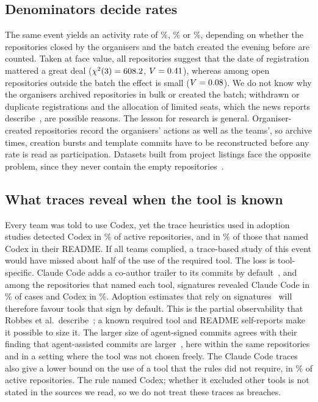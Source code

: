 \documentclass{article}
\begin{document}
\subsection{Denominators decide rates}
The same event yields an activity rate of \NRqOneActivePct\%, \NRqOneActiveOfOpenPct\% or \NRqOneActiveOfOpenNonbatchPct\%, depending on whether the repositories closed by the organisers and the batch created the evening before are counted. Taken at face value, all repositories suggest that the date of registration mattered a great deal ($\chi^2(\num{3}) = \num{608.2}$, $V = \num{0.41}$), whereas among open repositories outside the batch the effect is small ($V = \num{0.08}$). We do not know why the organisers archived repositories in bulk or created the batch; withdrawn or duplicate registrations and the allocation of limited seats, which the news reports describe~\cite{qumash2026queue,ulys2026survival}, are possible reasons. The lesson for research is general. Organiser-created repositories record the organisers' actions as well as the teams', so archive times, creation bursts and template commits have to be reconstructed before any rate is read as participation. Datasets built from project listings face the opposite problem, since they never contain the empty repositories~\cite{imam2021secretlife,mahmoud2022oneoff}.

\subsection{What traces reveal when the tool is known}
Every team was told to use Codex, yet the trace heuristics used in adoption studies detected Codex in \NRqTwoTracesCodexAnyPct\% of active repositories, and in \NRqTwoTracesSelfReportCodexTraceGivenMentionPct\% of those that named Codex in their README. If all teams complied, a trace-based study of this event would have missed about half of the use of the required tool. The loss is tool-specific. Claude Code adds a co-author trailer to its commits by default~\cite{claudecode2026attribution}, and among the repositories that named each tool, signatures revealed Claude Code in \NRqTwoTracesSelfReportClaudeSignatureGivenMentionPct\% of cases and Codex in \NRqTwoTracesSelfReportCodexSignatureGivenMentionPct\%. Adoption estimates that rely on signatures~\cite{li2025aidev,robbes2026agenticmuch} will therefore favour tools that sign by default. This is the partial observability that Robbes et al.\ describe~\cite{robbes2026heuristics}; a known required tool and README self-reports make it possible to size it. The larger size of agent-signed commits agrees with their finding that agent-assisted commits are larger~\cite{robbes2026agenticmuch}, here within the same repositories and in a setting where the tool was not chosen freely. The Claude Code traces also give a lower bound on the use of a tool that the rules did not require, in \NRqTwoTracesClaudeAnyPct\% of active repositories. The rule named Codex; whether it excluded other tools is not stated in the sources we read, so we do not treat these traces as breaches.
\end{document}

